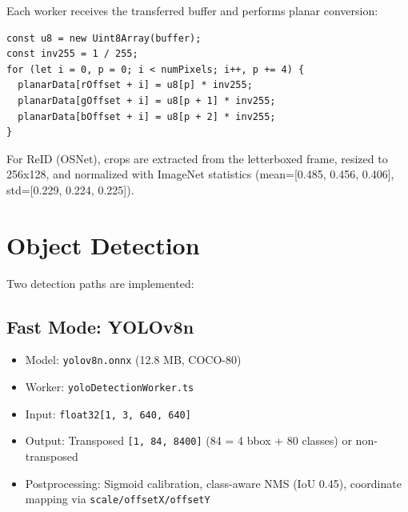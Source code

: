 Each worker receives the transferred buffer and performs planar conversion:

\begin{lstlisting}[style=typescript, caption={Planar conversion in yoloDetectionWorker.ts}]
const u8 = new Uint8Array(buffer);
const inv255 = 1 / 255;
for (let i = 0, p = 0; i < numPixels; i++, p += 4) {
  planarData[rOffset + i] = u8[p] * inv255;
  planarData[gOffset + i] = u8[p + 1] * inv255;
  planarData[bOffset + i] = u8[p + 2] * inv255;
}
\end{lstlisting}

For ReID (OSNet), crops are extracted from the letterboxed frame, resized to 256x128, and normalized with ImageNet statistics (mean=[0.485, 0.456, 0.406], std=[0.229, 0.224, 0.225]).

\section{Object Detection}
\label{sec:detection}

Two detection paths are implemented:

\subsection{Fast Mode: YOLOv8n}
\label{sec:yolo-fast}
\begin{itemize}
    \item Model: \texttt{yolov8n.onnx} (12.8 MB, COCO-80)
    \item Worker: \texttt{yoloDetectionWorker.ts}
    \item Input: \texttt{float32[1, 3, 640, 640]}
    \item Output: Transposed \texttt{[1, 84, 8400]} (84 = 4 bbox + 80 classes) or non-transposed
    \item Postprocessing: Sigmoid calibration, class-aware NMS (IoU 0.45), coordinate mapping via \texttt{scale/offsetX/offsetY}
\end{itemize}

